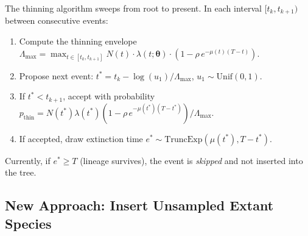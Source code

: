 \documentclass[11pt]{article}
\newcommand{\btheta}{\boldsymbol{\theta}}
\begin{document}
The thinning algorithm sweeps from root to present. In each interval $[t_k, t_{k+1})$ between consecutive events:
\begin{enumerate}
\item Compute the thinning envelope $\Lambda_{\max} = \max_{t \in [t_k, t_{k+1}]} N(t) \cdot \lambda(t;\btheta) \cdot (1 - \rho\, e^{-\mu(t)(T-t)})$.
\item Propose next event: $t^* = t_k - \log(u_1) / \Lambda_{\max}$, $u_1 \sim \mathrm{Unif}(0,1)$.
\item If $t^* < t_{k+1}$, accept with probability $p_{\mathrm{thin}} = N(t^*) \lambda(t^*) (1 - \rho\, e^{-\mu(t^*)(T-t^*)}) / \Lambda_{\max}$.
\item If accepted, draw extinction time $e^* \sim \mathrm{TruncExp}(\mu(t^*), T - t^*)$.
\end{enumerate}
Currently, if $e^* \geq T$ (lineage survives), the event is \emph{skipped} and not inserted into the tree.

\subsection{New Approach: Insert Unsampled Extant Species}
\end{document}
